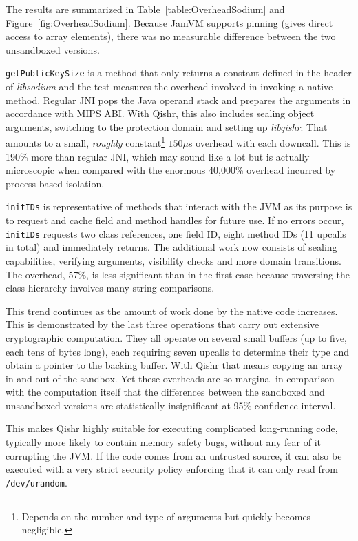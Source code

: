 \documentclass[a4paper,12pt,twoside,openright]{report}
\newcommand{\tool}[1]{\emph{#1}}
\newcommand{\lib}[1]{\tool{lib#1}}
\begin{document}
The results are summarized in Table~\ref{table:OverheadSodium} and Figure~\ref{fig:OverheadSodium}. Because JamVM supports pinning (gives direct access to array elements), there was no measurable difference between the two unsandboxed versions. 

\texttt{getPublicKeySize} is a method that only returns a constant defined in the header of \lib{sodium} and the test measures the overhead involved in invoking a native method. Regular JNI pops the Java operand stack and prepares the arguments in accordance with MIPS ABI. With Qishr, this also includes sealing object arguments, switching to the protection domain and setting up \lib{qishr}. That amounts to a small, \emph{roughly} constant\footnote{Depends on the number and type of arguments but quickly becomes negligible.} $150 \mu$s overhead with each downcall. This is 190\% more than regular JNI, which may sound like a lot but is actually microscopic when compared with the enormous 40,000\% overhead incurred by process-based isolation. 

\texttt{initIDs} is representative of methods that interact with the JVM as its purpose is to request and cache field and method handles for future use. If no errors occur, \texttt{initIDs} requests two class references, one field ID, eight method IDs (11 upcalls in total) and immediately returns. The additional work now consists of sealing capabilities, verifying arguments, visibility checks and more domain transitions. The overhead, 57\%, is less significant than in the first case because traversing the class hierarchy involves many string comparisons. 

This trend continues as the amount of work done by the native code increases. This is demonstrated by the last three operations that carry out extensive cryptographic computation. They all operate on several small buffers (up to five, each tens of bytes long), each requiring seven upcalls to determine their type and obtain a pointer to the backing buffer. With Qishr that means copying an array in and out of the sandbox. Yet these overheads are so marginal in comparison with the computation itself that the differences between the sandboxed and unsandboxed versions are statistically insignificant at 95\% confidence interval.

This makes Qishr highly suitable for executing complicated long-running code, typically more likely to contain memory safety bugs, without any fear of it corrupting the JVM. If the code comes from an untrusted source, it can also be executed with a very strict security policy enforcing that it can only read from \texttt{/dev/urandom}.
\end{document}
